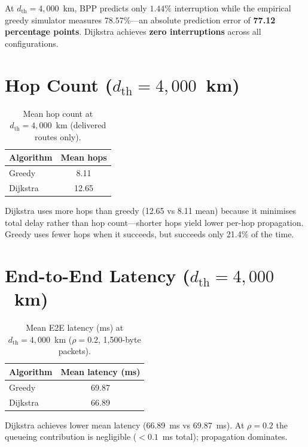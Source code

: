 \documentclass[12pt,a4paper]{report}
\newcommand{\dth}{d_{\mathrm{th}}}
\begin{document}
At $\dth = 4{,}000$~km, BPP predicts only $1.44\%$ interruption while the empirical
greedy simulator measures $78.57\%$---an absolute prediction error of
\textbf{77.12 percentage points}. Dijkstra achieves \textbf{zero interruptions}
across all configurations.

\section{Hop Count (\texorpdfstring{$d_\mathrm{th} = 4{,}000$}{dth=4000}~km)}

\begin{table}[H]
\centering
\caption{Mean hop count at $\dth=4{,}000$~km (delivered routes only).}
\label{tab:hops}
\begin{tabular}{lc}
\toprule
\textbf{Algorithm} & \textbf{Mean hops} \\
\midrule
Greedy   & 8.11  \\
Dijkstra & 12.65 \\
\bottomrule
\end{tabular}
\end{table}

Dijkstra uses more hops than greedy (12.65 vs 8.11 mean) because it minimises total
delay rather than hop count---shorter hops yield lower per-hop propagation. Greedy
uses fewer hops when it succeeds, but succeeds only 21.4\% of the time.

\section{End-to-End Latency (\texorpdfstring{$d_\mathrm{th} = 4{,}000$}{dth=4000}~km)}

\begin{table}[H]
\centering
\caption{Mean E2E latency (ms) at $\dth=4{,}000$~km ($\rho=0.2$, 1{,}500-byte packets).}
\label{tab:latency}
\begin{tabular}{lc}
\toprule
\textbf{Algorithm} & \textbf{Mean latency (ms)} \\
\midrule
Greedy   & 69.87 \\
Dijkstra & 66.89 \\
\bottomrule
\end{tabular}
\end{table}

Dijkstra achieves lower mean latency (66.89~ms vs 69.87~ms). At $\rho = 0.2$
the queueing contribution is negligible ($<0.1$~ms total); propagation dominates.

\end{document}
